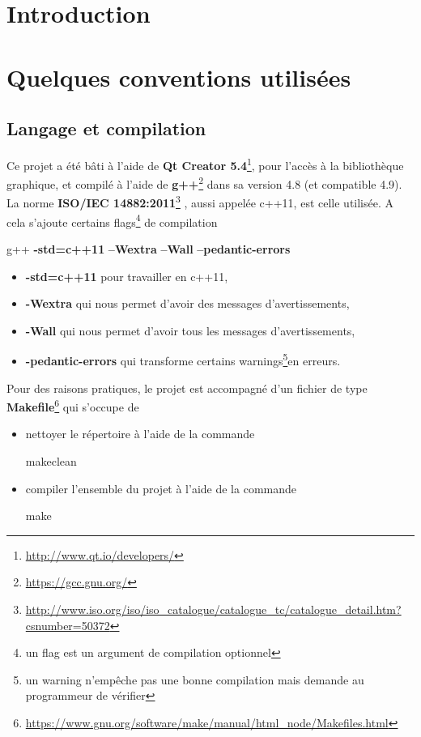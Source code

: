 \documentclass[a4paper,11pt]{report}
\begin{document}

\tableofcontents
\chapter{Introduction}




\chapter[Conventions]{Quelques conventions utilisées}
\section{Langage et compilation}
Ce projet a été bâti à l'aide de \textbf{Qt Creator
5.4}\footnote{\url{http://www.qt.io/developers/}}, pour l'accès à la bibliothèque
graphique, et compilé à l'aide de
\textbf{g++}\footnote{\url{https://gcc.gnu.org/}} dans sa version 4.8 (et
compatible 4.9). La norme \textbf{ISO/IEC
14882:2011}\footnote{\url{http://www.iso.org/iso/iso_catalogue/catalogue_tc/catalogue_detail.htm?csnumber=50372}}
, aussi appelée c++11, est celle
utilisée. A cela s'ajoute certains flags\footnote{un flag est un argument de
compilation optionnel} de compilation
\begin{center}
	g++
	\textbf{-std=c++11}\textvisiblespace
	\textbf{--Wextra}\textvisiblespace
	\textbf{--Wall}\textvisiblespace
	\textbf{--pedantic-errors}
\end{center}
\begin{itemize}
	\item \textbf{-std=c++11} pour travailler en c++11,
	\item \textbf{-Wextra} qui nous permet d'avoir des messages d'avertissements,
	\item \textbf{-Wall} qui nous permet d'avoir tous les messages d'avertissements,
	\item \textbf{-pedantic-errors} qui transforme certains warnings\footnote{un
			warning n'empêche pas une bonne compilation mais demande au
		programmeur de vérifier}en erreurs. \\
\end{itemize}
Pour des raisons pratiques, le projet est accompagné d'un fichier de type
\textbf{Makefile}\footnote{\url{https://www.gnu.org/software/make/manual/html_node/Makefiles.html}}
qui s'occupe de
\begin{itemize}
	\item nettoyer le répertoire à l'aide de la commande 
		\begin{center}
			make\textvisiblespace clean
		\end{center}
	\item compiler l'ensemble du projet à l'aide de la commande
		\begin{center}
			make
		\end{center}
\end{itemize}
\newpage
\end{document}
